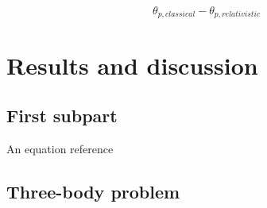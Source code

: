 \documentclass[%
 reprint,
 nobalance,
 amsmath,amssymb,
 aps,
]{revtex4-1}
\begin{document}
\begin{equation}
\theta_{p, classical} - \theta_{p, relativistic}
\end{equation}





\section{Results and discussion}

\subsection{\label{sec:Sub1}First subpart}
An equation reference %


\subsection{\label{sec:Sub2}Three-body problem}
\end{document}
